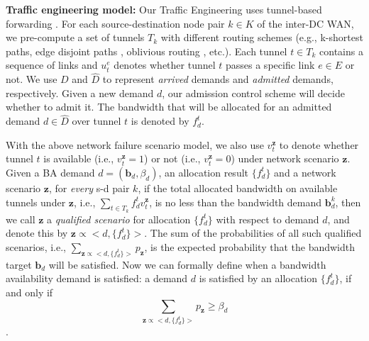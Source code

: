 \documentclass[sigconf]{acmart}
\begin{document}


\textbf{Traffic engineering model:}
Our Traffic Engineering uses tunnel-based forwarding \cite{FFC,swan,Teavar}.
For each source-destination node pair $k\in K$ of the inter-DC WAN, we pre-compute a set of tunnels $T_{k}$ with different routing schemes (e.g., k-shortest paths, edge disjoint paths \cite{Bruno2013Dynamic}, oblivious routing \cite{SMORE}, etc.). 
Each tunnel $t\in T_{k}$ contains a sequence of links and $u_t^e$ denotes whether tunnel $t$ passes a specific link $e \in E$ or not.
We use $D$ and $\hat{D}$ to represent \textit{arrived} demands and \textit{admitted} demands, respectively.
Given a new demand $d$, our admission control scheme will decide whether to admit it. 
The bandwidth that will be allocated for an admitted demand $d \in \hat{D}$ 
over tunnel $t$ is denoted by $f_d^t$.

With the above network failure scenario model, we also use 
$v_t^{\mathbf{z}}$ to denote whether tunnel $t$ is available (i.e., $v_t^{\mathbf{z}}=1$)  or not  (i.e., $v_t^{\mathbf{z}}=0$) under network scenario $\mathbf{z}$. 
Given a BA demand $d\!=\!(\mathbf{b}_d, \beta_d)$, an allocation result $\{f_d^t\}$ and a network scenario $\mathbf{z}$, 
for \textit{every} s-d pair $k$, 
if the total allocated bandwidth on available tunnels under $\mathbf{z}$, 
i.e., $\sum_{t \in T_k} f_d^t v_t^{\mathbf{z}}$,  
is no less than the bandwidth demand $\mathbf{b}_d^k$, 
then we call $\mathbf{z}$ a \textit{qualified scenario} for allocation $\{f_d^t\}$ with respect to demand $d$, 
and denote this by $\mathbf{z} \propto <d, \{f_d^t\}>$.
The sum of the probabilities of all such qualified scenarios, i.e., $\sum_{\mathbf{z} \propto <d, \{f_d^t\}>} p_{\mathbf{z}}$, is the expected probability that the bandwidth target $\mathbf{b}_d$ will be satisfied.
Now we can formally define when a bandwidth availability demand is satisfied: a demand $d$ is satisfied by an allocation $\{f_d^t\}$, if and only if 
\[
\sum_{\mathbf{z} \propto <d, \{f_d^t\}>} p_{\mathbf{z}} \ge \beta_d
\].
\end{document}
